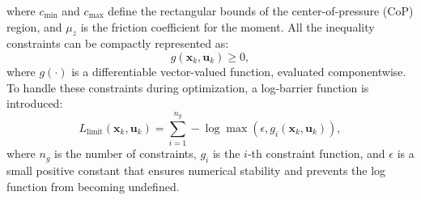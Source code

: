 \documentclass[main.tex]{subfiles}
\begin{document}
where $c_{\text{min}}$ and $c_{\text{max}}$ define the rectangular bounds of the center-of-pressure (CoP) region, and $\mu_z$ is the friction coefficient for the moment.
All the inequality constraints can be compactly represented as:
\begin{equation}
g(\mathbf{x}_k, \mathbf{u}_k) \geq 0,
\end{equation}
where $g(\cdot)$ is a differentiable vector-valued function, evaluated componentwise.
To handle these constraints during optimization, a log-barrier function is introduced:
\begin{equation}
L_{\text{limit}}(\mathbf{x}_k, \mathbf{u}_k) = \sum_{i=1}^{n_g} -\log \max(\epsilon, g_i(\mathbf{x}_k, \mathbf{u}_k)),
\end{equation}
where $n_g$ is the number of constraints, $g_i$ is the $i$-th constraint function, and $\epsilon$ is a small positive constant that ensures numerical stability and prevents the log function from becoming undefined.
\end{document}
